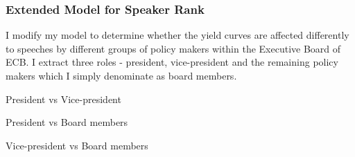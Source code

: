 \subsubsection{Extended Model for Speaker Rank}
I modify my model to determine whether the yield curves are affected differently to speeches by different groups of policy makers within the Executive Board of ECB. I extract three roles - president, vice-president and the remaining policy makers which I simply denominate as board members. 


President vs Vice-president


President vs Board members 


Vice-president vs Board members 



